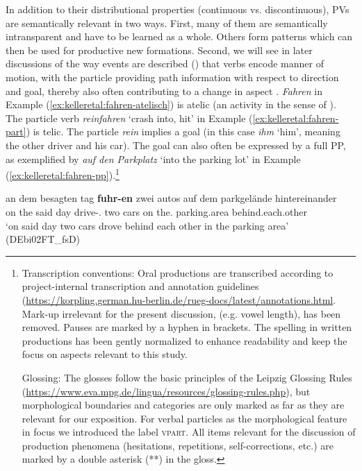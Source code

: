 \documentclass[output=paper,colorlinks,citecolor=brown]{langscibook}
\begin{document}
In addition to their distributional properties (continuous vs. discontinuous), PVs are semantically relevant in two ways. First, many of them are semantically intransparent and have to be learned as a whole. Others form patterns which can then be used for productive new formations. Second, we will see in later discussions of the way events are described () that verbs encode manner of motion, with the particle providing path information with respect to direction and goal, thereby also often contributing to a change in aspect \citep{Talmy1988, TennyPustejowski2000, Slobin2003Language}. \textit{Fahren} in Example (\ref{ex:kelleretal:fahren-atelisch}) is atelic (an activity in the sense of \citealt{Vendler1957}). The particle verb \textit{reinfahren} `crash into, hit' in Example (\ref{ex:kelleretal:fahren-part}) is telic. The particle \textit{rein} implies a goal (in this case \textit{ihm} `him', meaning the other driver and his car). The goal can also often be expressed by a full PP, as exemplified by \textit{auf den Parkplatz} `into the parking lot' in Example (\ref{ex:kelleretal:fahren-pp}).\footnote{Transcription conventions: Oral productions are transcribed according to project-internal transcription and annotation guidelines (\url{https://korpling.german.hu-berlin.de/rueg-docs/latest/annotations.html}. Mark-up irrelevant for the present discussion, (e.g. vowel length), has been removed. Pauses are marked by a hyphen in brackets. The spelling in written productions has been gently normalized to enhance readability and keep the focus on aspects relevant to this study.

Glossing: The glosses follow the basic principles of the Leipzig Glossing Rules (\url{https://www.eva.mpg.de/lingua/resources/glossing-rules.php}), but morphological boundaries and categories are only marked as far as they are relevant for our exposition. For verbal particles as the morphological feature in focus we introduced the label \textsc{vpart}. All items relevant for the discussion of production phenomena (hesitations, repetitions, self-corrections, etc.) are marked by a double asterisk (**) in the gloss.}


\ea
\label{ex:kelleretal:fahren-atelisch}
\gll an dem besagten tag \textbf{fuhr-en} zwei autos auf dem parkgelände hintereinander\\
on the said day drive-\Pst.\Tpl{} two cars on the.\Dat{} parking.area behind.each.other\\
\glt `on said day two cars drove behind each other in the parking area' (DEbi02FT\_fsD)
\end{document}
